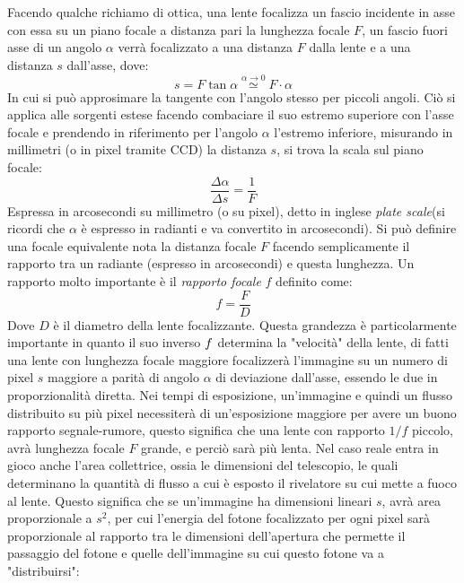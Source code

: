 \documentclass[a4paper,twoside,openany,notitlepage]{book}
\theoremstyle{definition}
\theoremstyle{plain}
\begin{document}
Facendo qualche richiamo di ottica, una lente focalizza un fascio incidente in asse con essa su un piano focale a distanza pari la lunghezza focale $F$, un fascio fuori asse di un angolo $\alpha$ verrà focalizzato a una distanza $F$ dalla lente e a una distanza $s$ dall'asse, dove:
\begin{equation*}
	s = F\tan\alpha \overset{\alpha\to0}{\simeq} F\cdot\alpha
\end{equation*}
In cui si può approsimare la tangente con l'angolo stesso per piccoli angoli. Ciò si applica alle sorgenti estese facendo combaciare il suo estremo superiore con l'asse focale e prendendo in riferimento per l'angolo $\alpha$ l'estremo inferiore, misurando in millimetri  (o in pixel tramite CCD) la distanza $s$, si trova la scala sul piano focale:
\begin{equation*}
	\frac{\Delta\alpha}{\Delta s} = \frac{1}{F}
\end{equation*}
Espressa in arcosecondi su millimetro (o su pixel), detto in inglese \textit{plate scale}(si ricordi che $\alpha$ è espresso in radianti e va convertito in arcosecondi). Si può definire una focale equivalente nota la distanza focale $F$ facendo semplicamente il rapporto tra un radiante (espresso in arcosecondi) e questa lunghezza. Un rapporto molto importante è il \textit{rapporto focale} $f$ definito come:
\begin{equation*}
	f=\frac{F}{D}
\end{equation*}
Dove $D$ è il diametro della lente focalizzante. Questa grandezza è particolarmente importante in quanto il suo inverso $\/f$ determina la "velocità" della lente, di fatti una lente con lunghezza focale maggiore focalizzerà l'immagine su un numero di pixel $s$ maggiore a parità di angolo $\alpha$ di deviazione dall'asse, essendo le due in proporzionalità diretta. Nei tempi di esposizione, un'immagine e quindi un flusso distribuito su più pixel necessiterà di un'esposizione maggiore per avere un buono rapporto segnale-rumore, questo significa che una lente con rapporto $1/f$ piccolo, avrà lunghezza focale $F$ grande, e perciò sarà più lenta. Nel caso reale entra in gioco anche l'area collettrice, ossia le dimensioni del telescopio, le quali determinano la quantità di flusso a cui è esposto il rivelatore su cui mette a fuoco al lente. Questo significa che se un'immagine ha dimensioni lineari $s$, avrà area proporzionale a $s^2$, per cui l'energia del fotone focalizzato per ogni pixel sarà proporzionale al rapporto tra le dimensioni dell'apertura che permette il passaggio del fotone e quelle dell'immagine su cui questo fotone va a "distribuirsi":
\end{document}
